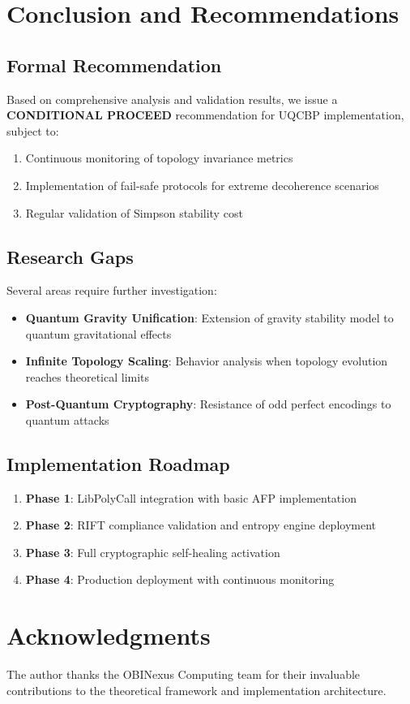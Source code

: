 \documentclass[11pt,a4paper]{article}
\begin{document}
\section{Conclusion and Recommendations}

\subsection{Formal Recommendation}

Based on comprehensive analysis and validation results, we issue a \textbf{CONDITIONAL PROCEED} recommendation for UQCBP implementation, subject to:

\begin{enumerate}
    \item Continuous monitoring of topology invariance metrics
    \item Implementation of fail-safe protocols for extreme decoherence scenarios
    \item Regular validation of Simpson stability cost
\end{enumerate}

\subsection{Research Gaps}

Several areas require further investigation:

\begin{itemize}
    \item \textbf{Quantum Gravity Unification}: Extension of gravity stability model to quantum gravitational effects
    \item \textbf{Infinite Topology Scaling}: Behavior analysis when topology evolution reaches theoretical limits
    \item \textbf{Post-Quantum Cryptography}: Resistance of odd perfect encodings to quantum attacks
\end{itemize}

\subsection{Implementation Roadmap}

\begin{enumerate}
    \item \textbf{Phase 1}: LibPolyCall integration with basic AFP implementation
    \item \textbf{Phase 2}: RIFT compliance validation and entropy engine deployment
    \item \textbf{Phase 3}: Full cryptographic self-healing activation
    \item \textbf{Phase 4}: Production deployment with continuous monitoring
\end{enumerate}

\section*{Acknowledgments}

The author thanks the OBINexus Computing team for their invaluable contributions to the theoretical framework and implementation architecture.
\cite{sample2024}


\end{document}

